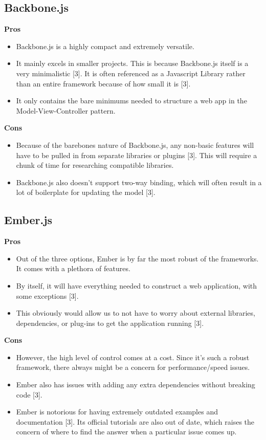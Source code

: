 \documentclass[onecolumn, draftclsnofoot,10pt, compsoc]{IEEEtran}
\begin{document}
	\subsection{Backbone.js}	
	\textbf{Pros}	
			\begin{itemize}
				\item Backbone.js is a highly compact and extremely versatile. 
				\item It mainly excels in smaller projects. This is because Backbone.js itself is a very minimalistic [3]. It is often referenced as a Javascript Library rather than an entire framework because of how small it is [3]. 
				\item It only contains the bare minimums needed to structure a web app in the Model-View-Controller pattern.
			\end{itemize}
	\textbf{Cons}
		\begin{itemize}
			\item Because of the barebones nature of Backbone.js, any non-basic features will have to be pulled in from separate libraries or plugins [3]. This will require a chunk of time for researching compatible libraries. 
			\item Backbone.js also doesn't support two-way binding, which will often result in a lot of boilerplate for updating the model [3].
		\end{itemize}
	\subsection{Ember.js}
	
		\textbf{Pros}
			\begin{itemize}
				\item Out of the three options, Ember is by far the most robust of the frameworks. It comes with a plethora of features. 
				\item By itself, it will have everything needed to construct a web application, with some exceptions [3]. 
				\item This obviously would allow us to not have to worry about external libraries, dependencies, or plug-ins to get the application running [3].
			\end{itemize}
		\textbf{Cons}
			\begin{itemize}
				\item However, the high level of control comes at a cost. Since it's such a robust framework, there always might be a concern for performance/speed issues. 
				\item Ember also has issues with adding any extra dependencies without breaking code [3].
				\item Ember is notorious for having extremely outdated examples and documentation [3]. Its official tutorials are also out of date, which raises the concern of where to find the answer when a particular issue comes up.
			\end{itemize}	
\end{document}
